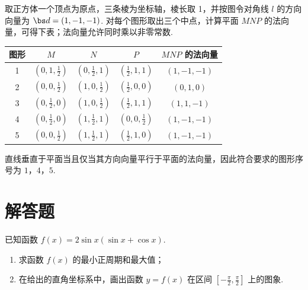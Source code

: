 \begin{solution}
取正方体一个顶点为原点，三条棱为坐标轴，棱长取 1，并按图令对角线 \(l\) 的方向向量为 \(\bs d=(1,-1,-1)\). 对每个图形取出三个中点，计算平面 \(MNP\) 的法向量，可得下表；法向量允许同时乘以非零常数.

\begin{center}
\begin{tabular}{c|c|c|c|c}
图形 & \(M\) & \(N\) & \(P\) & \(MNP\) 的法向量 \\
\hline
1 & \(\left(0,1,\frac12\right)\) & \(\left(0,\frac12,1\right)\) & \(\left(\frac12,1,1\right)\) & \((1,-1,-1)\) \\
2 & \(\left(0,0,\frac12\right)\) & \(\left(1,0,\frac12\right)\) & \(\left(\frac12,0,0\right)\) & \((0,1,0)\) \\
3 & \(\left(0,\frac12,0\right)\) & \(\left(1,0,\frac12\right)\) & \(\left(\frac12,1,1\right)\) & \((1,1,-1)\) \\
4 & \(\left(0,\frac12,0\right)\) & \(\left(1,\frac12,1\right)\) & \(\left(0,0,\frac12\right)\) & \((1,-1,-1)\) \\
5 & \(\left(0,0,\frac12\right)\) & \(\left(1,\frac12,1\right)\) & \(\left(\frac12,1,0\right)\) & \((1,-1,-1)\)
\end{tabular}
\end{center}

直线垂直于平面当且仅当其方向向量平行于平面的法向量，因此符合要求的图形序号为 \(1\)，\(4\)，\(5\).
\end{solution}

\section{解答题}
\begin{problem}
已知函数 \( f(x) = 2\sin x (\sin x + \cos x) \).

\begin{enumerate}
\item 求函数 \( f(x) \) 的最小正周期和最大值；
\item 在给出的直角坐标系中，画出函数 \( y = f(x) \) 在区间 \(\left[-\frac{\pi}{2}, \frac{\pi}{2}\right]\) 上的图象.
\end{enumerate}
\end{problem}

